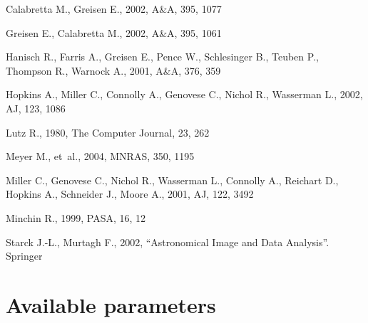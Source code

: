 \documentclass[12pt,a4paper]{article}
\begin{document}
%
%
%
\begin{thebibliography}{}

{Calabretta} M.,  {Greisen} E.,  2002, A\&A, 395, 1077

{Greisen} E.,  {Calabretta} M.,  2002, A\&A, 395, 1061

{Hanisch} R.,  {Farris} A.,  {Greisen} E.,  {Pence} W.,  {Schlesinger} B.,
  {Teuben} P.,  {Thompson} R.,    {Warnock} A.,  2001, A\&A, 376, 359

{Hopkins} A.,  {Miller} C.,  {Connolly} A.,  {Genovese} C.,  {Nichol} R.,
  {Wasserman} L.,  2002, AJ, 123, 1086

Lutz R.,  1980, The Computer Journal, 23, 262

{Meyer} M.,  et~al., 2004, MNRAS, 350, 1195

{Miller} C.,  {Genovese} C.,  {Nichol} R.,  {Wasserman} L.,  {Connolly} A.,
  {Reichart} D.,  {Hopkins} A.,  {Schneider} J.,    {Moore} A.,  2001, AJ, 122,
  3492

Minchin R.,  1999, PASA, 16, 12

Starck J.-L.,  Murtagh F.,  2002, {``Astronomical Image and Data Analysis''}.
Springer

\end{thebibliography}


\appendix
\newpage
\section{Available parameters}
\label{app-param}
\end{document}
